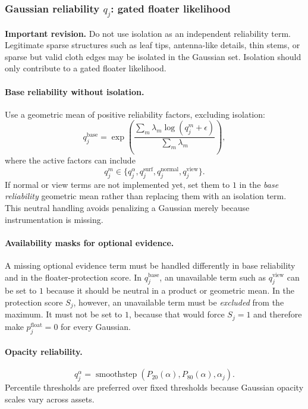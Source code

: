 \documentclass[11pt,a4paper]{article}
\newcommand{\smoothstep}{\operatorname{smoothstep}}
\begin{document}
\subsubsection{Gaussian reliability $q_j$: gated floater likelihood}

\textbf{Important revision.} Do not use isolation as an independent reliability term. Legitimate sparse structures such as leaf tips, antenna-like details, thin stems, or sparse but valid cloth edges may be isolated in the Gaussian set. Isolation should only contribute to a gated floater likelihood.

\paragraph{Base reliability without isolation.}
Use a geometric mean of positive reliability factors, excluding isolation:
\[
q_j^{\mathrm{base}}=\exp\left(
\frac{\sum_m \lambda_m\log(q_j^m+\epsilon)}{\sum_m\lambda_m}
\right),
\]
where the active factors can include
\[
q_j^m\in\{q_j^{\alpha},q_j^{\mathrm{surf}},q_j^{\mathrm{normal}},q_j^{\mathrm{view}}\}.
\]
If normal or view terms are not implemented yet, set them to $1$ in the \emph{base reliability} geometric mean rather than replacing them with an isolation term. This neutral handling avoids penalizing a Gaussian merely because instrumentation is missing.

\paragraph{Availability masks for optional evidence.}
A missing optional evidence term must be handled differently in base reliability and in the floater-protection score. In $q_j^{\mathrm{base}}$, an unavailable term such as $q_j^{\mathrm{view}}$ can be set to $1$ because it should be neutral in a product or geometric mean. In the protection score $S_j$, however, an unavailable term must be \emph{excluded} from the maximum. It must not be set to $1$, because that would force $S_j=1$ and therefore make $p_j^{\mathrm{float}}=0$ for every Gaussian.

\paragraph{Opacity reliability.}
\[
q_j^{\alpha}=\smoothstep(P_{20}(\alpha),P_{80}(\alpha),\alpha_j).
\]
Percentile thresholds are preferred over fixed thresholds because Gaussian opacity scales vary across assets.
\end{document}
